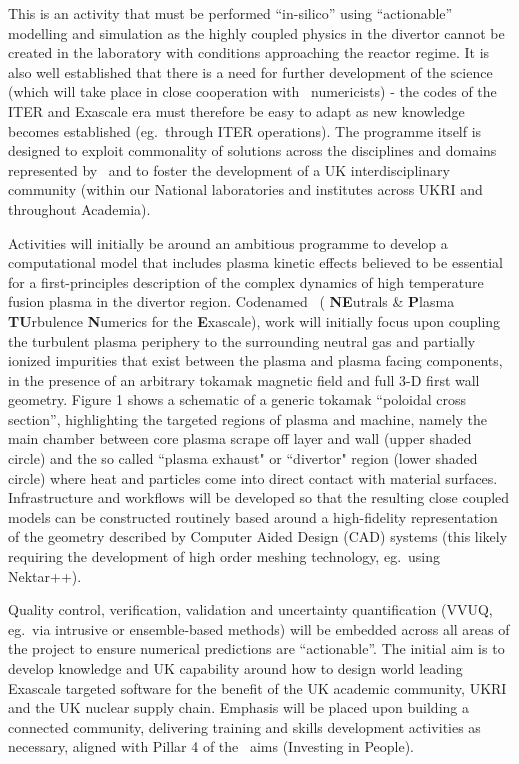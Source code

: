 This is an activity that must be performed ``in-silico'' 
using ``actionable'' modelling and simulation as the highly coupled physics in 
the divertor cannot be created in the laboratory with conditions approaching the 
reactor regime. It is also well established that there is a need for further development 
of the science (which will take place in close cooperation with \exc \   numericists) 
- the codes of the ITER and Exascale era must therefore be easy to adapt as new 
knowledge becomes established (eg.\ through ITER operations). The programme itself 
is designed to exploit commonality of solutions across the disciplines and domains 
represented by \exc \   and to foster the development of a UK interdisciplinary 
community (within our National laboratories and institutes across UKRI and throughout 
Academia).

Activities will initially be around an ambitious programme to develop a computational 
model that includes plasma kinetic effects believed to be essential for a first-principles 
description of the complex dynamics of high temperature fusion plasma in the divertor 
region.  Codenamed \nep \   ( \textbf{NE}utrals \&  \textbf{P}lasma  \textbf{TU}rbulence 
\textbf{N}umerics for the  \textbf{E}xascale), 
work will initially focus upon coupling the turbulent plasma periphery to the surrounding 
neutral gas and partially ionized impurities that exist between the plasma and 
plasma facing components, in the presence of an arbitrary tokamak magnetic field 
and full 3-D first wall geometry. Figure 1 shows a schematic of a generic tokamak 
``poloidal cross section'', highlighting the targeted regions of plasma and machine, 
namely the main chamber between
core plasma scrape off layer and wall (upper shaded circle) and the so called ``plasma
exhaust" or ``divertor" region (lower shaded circle) where heat and particles come into direct
contact with material surfaces. Infrastructure and workflows will be developed so that the
resulting close coupled
models can be constructed routinely based around a high-fidelity representation 
of the geometry described by Computer Aided Design (CAD) systems (this likely requiring 
the development of high order meshing technology, eg.\ using Nektar++).

Quality control, verification, validation and uncertainty quantification 
(VVUQ, eg.\ via intrusive or ensemble-based methods) will be embedded across all 
areas of the project to ensure numerical predictions are ``actionable''. The initial 
aim is to develop knowledge and UK capability around how to design world leading 
Exascale targeted software for the benefit of the UK academic community, UKRI and 
the UK nuclear supply chain. Emphasis will be placed upon building a connected 
community, delivering training and skills development activities as necessary, 
aligned with Pillar 4 of the \exc \   aims (Investing in People).

